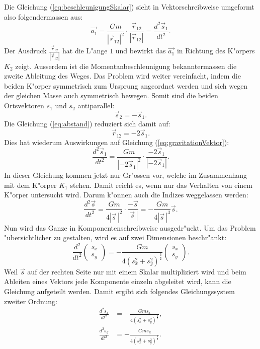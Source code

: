 \begin{refsection}
Die Gleichung (\ref{eq:beschleunigungSkalar}) sieht in Vektorschreibweise umgeformt also folgendermassen aus:
\begin{equation} \label{eq:gravitationVektor}
\vec{a_1} =\frac{G m}{| \vec{r}_{12}|^2}\cdot \frac{\vec{r}_{12}}{| \vec{r}_{12}|}=  \frac{d^2 \vec{s}_1}{dt^2}.
\end{equation}
Der Ausdruck $\frac{\vec{r}_{12}}{| \vec{r}_{12}|}$ hat die L"ange $1$ und bewirkt das $\vec{a_1}$ in Richtung des K"orpers $K_2$ zeigt.
Ausserdem ist die Momentanbeschleunigung bekanntermassen die zweite Ableitung des Weges. 
Das Problem wird weiter vereinfacht, indem die beiden K"orper symmetrisch zum Ursprung angeordnet werden und sich wegen der gleichen Masse auch symmetrisch bewegen.
Somit sind die beiden Ortsvektoren $s_1$ und $s_2$ antiparallel:
\[
\vec{s}_2=-\vec{s}_1.
\]
Die Gleichung (\ref{eq:abstand}) reduziert sich damit auf:
\[
\vec{r}_{12}= -2\vec{s}_1.
\]
Dies hat wiederum Auswirkungen auf Gleichung (\ref{eq:gravitationVektor}):
\[
\frac{d^2 \vec{s}_1}{dt^2} =\frac{G m}{| -2\vec{s}_{1}|^2}\cdot \frac{-2\vec{s}_{1}}{| -2\vec{s}_{1}|}.
\]
In dieser Gleichung kommen jetzt nur Gr"ossen vor, welche im Zusammenhang mit dem K"orper $K_1$ stehen.
Damit reicht es, wenn nur das Verhalten von einem K"orper untersucht wird. 
Darum k"onnen auch die Indizes weggelassen werden:
\[
\frac{d^2\vec{s}}{dt^2}=\frac{G m}{4|\vec{s}\,|^2}\cdot\frac{-\vec{s}}{|\vec{s}\,|}=-\frac{G m}{4|\vec{s}\,|^3}{\vec{s}}.
\]
Nun wird das Ganze in Komponentenschreibweise ausgedr"uckt.
Um das Problem "ubersichtlicher zu gestalten, wird es auf zwei Dimensionen beschr"ankt:
\[
\frac{d^2}{dt^2}
\begin{pmatrix}
s_x \\ s_y
\end{pmatrix}
=
-\frac{G m}{4(s_x^2 + s_y^2)^\frac32}
\begin{pmatrix}
s_x \\ s_y
\end{pmatrix}.
\]
Weil $\vec{s}$ auf der rechten Seite nur mit einem Skalar multipliziert wird und beim Ableiten eines Vektors jede Komponente einzeln abgeleitet wird, kann die Gleichung aufgeteilt werden.
Damit ergibt sich folgendes Gleichungssystem zweiter Ordnung:
\begin{align}
\frac{d^2s_x}{dt^2}&=-\frac{G m s_x}{4(s_x^2 + s_y^2)^\frac32},
\label{eq:kompSchreibwEins}
\\
\frac{d^2s_y}{dt^2}&=-\frac{G m s_y}{4(s_x^2 + s_y^2)^\frac32}.
\label{eq:kompSchreibwZwei}
\end{align}

\end{refsection}
